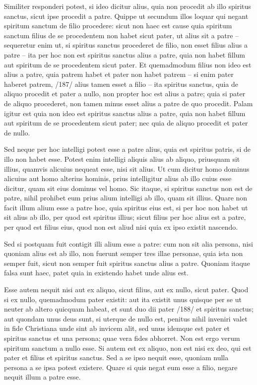 Similiter responderi potest, si ideo dicitur alius, quia non procedit ab illo spiritus sanctus, sicut ipse procedit a patre. Quippe ut secundum illos loquar qui negant spiritum sanctum de filio procedere: sicut non haec est cause quia spiritum sanctum filius de se procedentem non habet sicut pater, ut alius sit a patre -- sequeretur enim ut, si spiritus sanctus procederet de filio, non esset filius alius a patre -- ita per hoc non est spiritus sanctus alius a patre, quia non habet fillum aut spiritum de se procedentem sicut pater. Et quemadmodum filius non ideo est alius a patre, quia patrem habet et pater non habet patrem -- si enim pater haberet patrem, /187/ alius tamen esset a filio -- ita spiritus sanctus, quia de aliquo procedit et pater a nullo, non propter hoc est alius a patre; quia si pater de aliquo procederet, non tamen minus esset alius a patre de quo procedit. Palam igitur est quia non ideo est spiritus sanctus alius a patre, quia non habet fillum aut spiritum de se procedentem sicut pater; nec quia de aliquo procedit et pater de nullo.

Sed neque per hoc intelligi potest esse a patre alius, quia est spiritus patris, si de illo non habet esse. Potest enim intelligi aliquis alius ab aliquo, priusquam sit illius, quamvis alicuius nequeat esse, nisi sit alius. Ut cum dicitur homo dominus alicuius aut homo alterius hominis, prius intelligitur alius ab illo cuius esse dicitur, quam sit eius dominus vel homo. Sic itaque, si spiritus sanctus non est de patre, nihil prohibet eum prius alium intelligi ab illo, quam sit illius. Quare non facit illum alium esse a patre hoc, quia spiritus eius est, si per hoc non habet ut sit alius ab illo, per quod est spiritus illius; sicut filius per hoc alius est a patre, per quod est filius eius, quod non est aliud nisi quia ex ipso existit nascendo.

Sed si postquam fuit contigit illi alium esse a patre: cum non sit alia persona, nisi quoniam alius est ab illo, non fuerunt semper tres illae personae, quia ista non semper fuit, sicut non semper fuit spiritus sanctus alius a patre. Quoniam itaque falsa sunt haec, patet quia in existendo habet unde alius est.

Esse autem nequit nisi aut ex aliquo, sicut filius, aut ex nullo, sicut pater. Quod si ex nullo, quemadmodum pater existit: aut ita existit unus quisque per se ut neuter ab altero quicquam habeat, et sunt duo dii pater /188/ et spiritus sanctus; aut quondam unus deus sunt, si uterque de nullo est, penitus nihil inveniri valet in fide Christiana unde sint ab invicem alit, sed unus idemque est pater et spiritus sanctus et una persona; quae vera fides abhorret. Non est ergo verum spiritum sanctum a nullo esse. Si autem est ex aliquo, non est nisi ex deo, qui est pater et filius et spiritus sanctus. Sed a se ipso nequit esse, quoniam nulla persona a se ipsa potest existere. Quare si quis negat eum esse a filio, negare nequit illum a patre esse.

